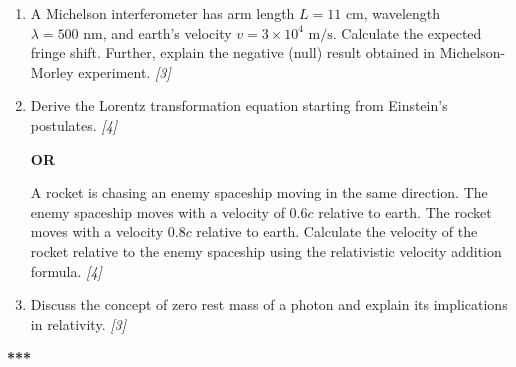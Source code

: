 \documentclass[11pt,a4paper]{article}
\newcommand{\pts}[1]{\hfill \textit{[#1]}}
\begin{document}
\begin{enumerate}[label=\textbf{\arabic*.},start=2,leftmargin=*,itemsep=14pt]
  \item A Michelson interferometer has arm length $L = 11\text{ cm}$, wavelength $\lambda = 500\text{ nm}$, and earth's velocity $v = 3 \times 10^4\text{ m/s}$. Calculate the expected fringe shift. Further, explain the negative (null) result obtained in Michelson-Morley experiment. \pts{3}

  \item Derive the Lorentz transformation equation starting from Einstein's postulates. \pts{4}
  \begin{center}\textbf{OR}\end{center}
  A rocket is chasing an enemy spaceship moving in the same direction. The enemy spaceship moves with a velocity of $0.6c$ relative to earth. The rocket moves with a velocity $0.8c$ relative to earth. Calculate the velocity of the rocket relative to the enemy spaceship using the relativistic velocity addition formula. \pts{4}

  \item Discuss the concept of zero rest mass of a photon and explain its implications in relativity. \pts{3}
\end{enumerate}

\bigskip
\begin{center}
  \textbf{***}
\end{center}
\end{document}

